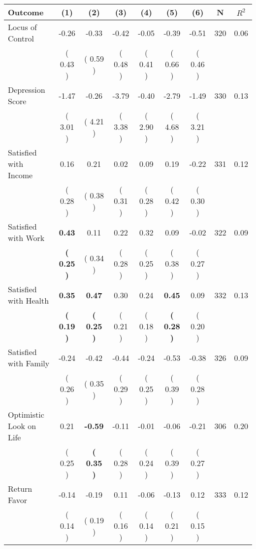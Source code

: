 \begin{tabular}{lcccccccc}
\toprule
 \textbf{Outcome} & \textbf{(1)} & \textbf{(2)} & \textbf{(3)} & \textbf{(4)} & \textbf{(5)} & \textbf{(6)} & \textbf{N} & \textbf{$ R^2$} \\
\midrule
Locus of Control &     -0.26 &     -0.33 &     -0.42 &     -0.05 &     -0.39 &     -0.51 & 320 &       0.06 \\ 
 & (     0.43 ) & (     0.59 ) & (     0.48 ) & (     0.41 ) & (     0.66 ) & (     0.46 ) & \\
Depression Score &     -1.47 &     -0.26 &     -3.79 &     -0.40 &     -2.79 &     -1.49 & 330 &       0.13 \\ 
 & (     3.01 ) & (     4.21 ) & (     3.38 ) & (     2.90 ) & (     4.68 ) & (     3.21 ) & \\
Satisfied with Income &      0.16 &      0.21 &      0.02 &      0.09 &      0.19 &     -0.22 & 331 &       0.12 \\ 
 & (     0.28 ) & (     0.38 ) & (     0.31 ) & (     0.28 ) & (     0.42 ) & (     0.30 ) & \\
Satisfied with Work & \textbf{     0.43} &      0.11 &      0.22 &      0.32 &      0.09 &     -0.02 & 322 &       0.09 \\ 
 & \textbf{(     0.25 )} & (     0.34 ) & (     0.28 ) & (     0.25 ) & (     0.38 ) & (     0.27 ) & \\
Satisfied with Health & \textbf{     0.35} & \textbf{     0.47} &      0.30 &      0.24 & \textbf{     0.45} &      0.09 & 332 &       0.13 \\ 
 & \textbf{(     0.19 )} & \textbf{(     0.25 )} & (     0.21 ) & (     0.18 ) & \textbf{(     0.28 )} & (     0.20 ) & \\
Satisfied with Family &     -0.24 &     -0.42 &     -0.44 &     -0.24 &     -0.53 &     -0.38 & 326 &       0.09 \\ 
 & (     0.26 ) & (     0.35 ) & (     0.29 ) & (     0.25 ) & (     0.39 ) & (     0.28 ) & \\
Optimistic Look on Life &      0.21 & \textbf{    -0.59} &     -0.11 &     -0.01 &     -0.06 &     -0.21 & 306 &       0.20 \\ 
 & (     0.25 ) & \textbf{(     0.35 )} & (     0.28 ) & (     0.24 ) & (     0.39 ) & (     0.27 ) & \\
Return Favor &     -0.14 &     -0.19 &      0.11 &     -0.06 &     -0.13 &      0.12 & 333 &       0.12 \\ 
 & (     0.14 ) & (     0.19 ) & (     0.16 ) & (     0.14 ) & (     0.21 ) & (     0.15 ) & \\

\end{tabular}
